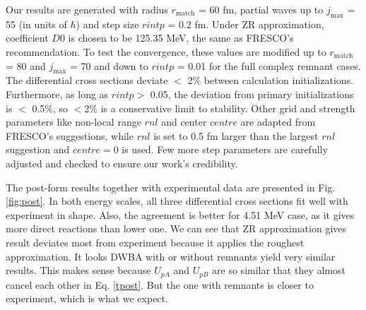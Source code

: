 Our results are generated with radius $r_{\mathrm{match}}$ = 60 fm, partial waves up to $j_{\max}$ = 55 (in units of $\hbar$) and step size $rintp$ = 0.2 fm. 
Under ZR approximation, coefficient $D0$ is chosen to be 125.35 MeV, the same as FRESCO's recommendation. 
To test the convergence, these values are modified up to $r_{\mathrm{match}}$ = 80 and $j_{\max}$ = 70 and down to $rintp$ = 0.01 for the full complex remnant cases.
 The differential cross sections deviate $<$ 2$\%$  between calculation initializations. 
 Furthermore, as long as $rintp >$ 0.05, the deviation from primary initializations is $<$ 0.5$\%$, so $< 2\%$ is a conservative limit to stability. 
 Other grid and strength parameters like non-local range $rnl$ and center $centre$ are adapted from FRESCO's suggestions,
while $rnl$ is set to 0.5 fm larger than the largest $rnl$ suggestion and $centre=0$ is used.
Few more step parameters are carefully adjusted and checked to ensure our work's credibility.

The post-form results together with experimental data \cite{PhysRev.101.209} are presented in Fig. \ref{fig:post}.
In both energy scales, all three differential cross sections fit well with experiment in shape. 
Also, the agreement is better for 4.51 MeV case, as it gives more direct reactions than lower one.
We can see that ZR approximation gives result deviates most from experiment because it applies the roughest approximation.
It looks DWBA with or without remnants yield very similar results.
This makes sense because $U_{pA}$ and $U_{pB}$ are so similar that they almost cancel each other in Eq. \ref{tpost}.
But the one with remnants is closer to experiment, which is what we expect. 